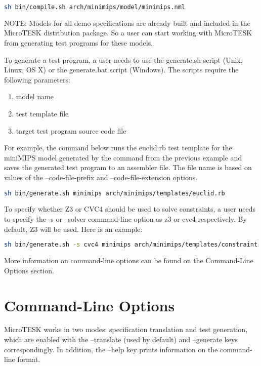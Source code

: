 \documentclass[oneside,final,14pt]{extreport}
\begin{document}
\begin{lstlisting}[language=bash]
sh bin/compile.sh arch/minimips/model/minimips.nml
\end{lstlisting}

NOTE: Models for all demo specifications are already built and included in the
MicroTESK distribution package. So a user can start working with MicroTESK from
generating test programs for these models.

To generate a test program, a user needs to use the generate.sh script
(Unix, Linux, OS X) or the generate.bat script (Windows). The scripts
require the following parameters:

\begin{enumerate}
  \item model name
  \item test template file
  \item target test program source code file
\end{enumerate}

For example, the command below runs the euclid.rb test template for
the miniMIPS model generated by the command from the previous example and saves
the generated test program to an assembler file. The file name is based on values
of the --code-file-prefix and --code-file-extension options.

\begin{lstlisting}[language=bash]
sh bin/generate.sh minimips arch/minimips/templates/euclid.rb
\end{lstlisting}

To specify whether Z3 or CVC4 should be used to solve constraints,
a user needs to specify the -s or --solver command-line option as z3
or cvc4 respectively. By default, Z3 will be used. Here is an example:

\begin{lstlisting}[language=bash]
sh bin/generate.sh -s cvc4 minimips arch/minimips/templates/constraint.rb
\end{lstlisting}

More information on command-line options can be found on the Command-Line Options
section.

\section{Command-Line Options}

MicroTESK works in two modes: specification translation and test generation,
which are enabled with the --translate (used by default) and --generate keys
correspondingly. In addition, the --help key prints information on the command-line format.
\end{document}
